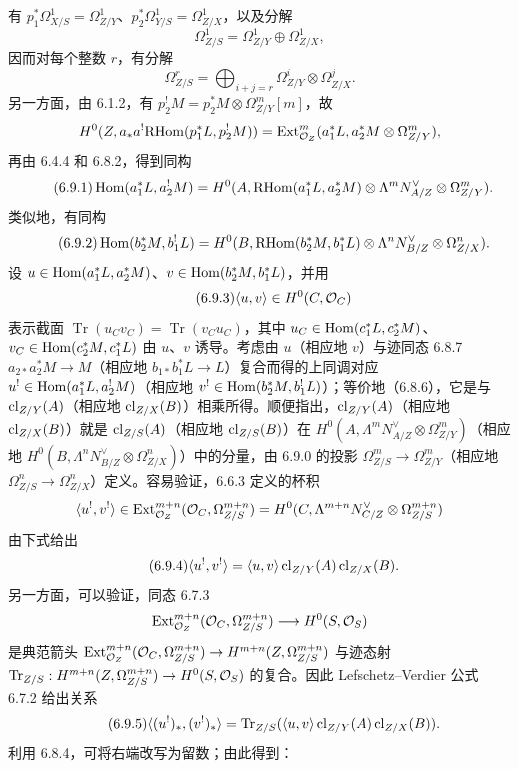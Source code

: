 有 $p_1^*\Omega^1_{X/S}=\Omega^1_{Z/Y}$、$p_2^*\Omega^1_{Y/S}=\Omega^1_{Z/X}$，以及分解
\[
\Omega^1_{Z/S}=\Omega^1_{Z/Y}\oplus\Omega^1_{Z/X},
\]
因而对每个整数 $r$，有分解
\begin{equation}
\tag{6.9.0}
\Omega^r_{Z/S}=\bigoplus_{i+j=r}\Omega^i_{Z/Y}\otimes\Omega^j_{Z/X}.
\end{equation}
另一方面，由 6.1.2，有 $p_2^!M=p_2^*M\otimes\Omega^m_{Z/Y}[m]$，故
\[
H^0(Z,a_*a^!\mathrm{RHom}(p_1^*L,p_2^!M))=\operatorname{Ext}^m_{\mathcal{O}_Z}(a_1^*L,a_2^*M\otimes\Omega^m_{Z/Y}),
\]
再由 6.4.4 和 6.8.2，得到同构
\begin{equation}
\tag{6.9.1}
\operatorname{Hom}(a_1^*L,a_2^!M)=H^0(A,\mathrm{RHom}(a_1^*L,a_2^*M)\otimes\Lambda^m N_{A/Z}^{\vee}\otimes\Omega^m_{Z/Y}).
\end{equation}
类似地，有同构
\begin{equation}
\tag{6.9.2}
\operatorname{Hom}(b_2^*M,b_1^!L)=H^0(B,\mathrm{RHom}(b_2^*M,b_1^*L)\otimes\Lambda^n N_{B/Z}^{\vee}\otimes\Omega^n_{Z/X}).
\end{equation}
设 $u\in\operatorname{Hom}(a_1^*L,a_2^*M)$、$v\in\operatorname{Hom}(b_2^*M,b_1^*L)$，并用
\begin{equation}
\tag{6.9.3}
\langle u,v\rangle\in H^0(C,\mathcal{O}_C)
\end{equation}
表示截面 $\operatorname{Tr}(u_Cv_C)=\operatorname{Tr}(v_Cu_C)$，其中 $u_C\in\operatorname{Hom}(c_1^*L,c_2^*M)$、$v_C\in\operatorname{Hom}(c_2^*M,c_1^*L)$ 由 $u$、$v$ 诱导。考虑由 $u$（相应地 $v$）与迹同态 6.8.7 $a_{2*}a_2^*M\to M$（相应地 $b_{1*}b_1^*L\to L$）复合而得的上同调对应 $u^!\in\operatorname{Hom}(a_1^*L,a_2^!M)$（相应地 $v^!\in\operatorname{Hom}(b_2^*M,b_1^!L)$）；等价地（6.8.6），它是与 $\operatorname{cl}_{Z/Y}(A)$（相应地 $\operatorname{cl}_{Z/X}(B)$）相乘所得。顺便指出，$\operatorname{cl}_{Z/Y}(A)$（相应地 $\operatorname{cl}_{Z/X}(B)$）就是 $\operatorname{cl}_{Z/S}(A)$（相应地 $\operatorname{cl}_{Z/S}(B)$）在 $H^0(A,\Lambda^mN_{A/Z}^{\vee}\otimes\Omega^m_{Z/Y})$（相应地 $H^0(B,\Lambda^nN_{B/Z}^{\vee}\otimes\Omega^n_{Z/X})$）中的分量，由 6.9.0 的投影 $\Omega^m_{Z/S}\to\Omega^m_{Z/Y}$（相应地 $\Omega^n_{Z/S}\to\Omega^n_{Z/X}$）定义。容易验证，6.6.3 定义的杯积
\[
\langle u^!,v^!\rangle\in\operatorname{Ext}^{m+n}_{\mathcal{O}_Z}(\mathcal{O}_C,\Omega^{m+n}_{Z/S})=H^0(C,\Lambda^{m+n}N_{C/Z}^{\vee}\otimes\Omega^{m+n}_{Z/S})
\]
由下式给出
\begin{equation}
\tag{6.9.4}
\langle u^!,v^!\rangle=\langle u,v\rangle\operatorname{cl}_{Z/Y}(A)\operatorname{cl}_{Z/X}(B).
\end{equation}
另一方面，可以验证，同态 6.7.3
\[
\operatorname{Ext}^{m+n}_{\mathcal{O}_Z}(\mathcal{O}_C,\Omega^{m+n}_{Z/S})\longrightarrow H^0(S,\mathcal{O}_S)
\]
是典范箭头 $\operatorname{Ext}^{m+n}_{\mathcal{O}_Z}(\mathcal{O}_C,\Omega^{m+n}_{Z/S})\to H^{m+n}(Z,\Omega^{m+n}_{Z/S})$ 与迹态射 $\operatorname{Tr}_{Z/S}:H^{m+n}(Z,\Omega^{m+n}_{Z/S})\to H^0(S,\mathcal{O}_S)$ 的复合。因此 Lefschetz--Verdier 公式 6.7.2 给出关系
\begin{equation}
\tag{6.9.5}
\langle (u^!)_*,(v^!)_*\rangle=\operatorname{Tr}_{Z/S}(\langle u,v\rangle\operatorname{cl}_{Z/Y}(A)\operatorname{cl}_{Z/X}(B)).
\end{equation}
利用 6.8.4，可将右端改写为留数；由此得到：



